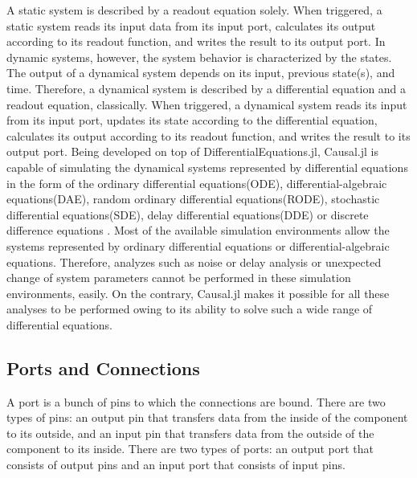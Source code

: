 \documentclass{juliacon}
\begin{document}
A static system is described by a readout equation solely. When triggered, a static system reads its input data from its input port, calculates its output according to its readout function, and writes the result to its output port. In dynamic systems, however, the system behavior is characterized by the states. The output of a dynamical system depends on its input, previous state(s), and time. Therefore, a dynamical system is described by a differential equation and a readout equation, classically. When triggered, a dynamical system reads its input from its input port, updates its state according to the differential equation, calculates its output according to its readout function, and writes the result to its output port. Being developed on top of DifferentialEquations.jl, Causal.jl is capable of simulating the dynamical systems represented by differential equations in the form of the ordinary differential equations(ODE), differential-algebraic equations(DAE), random ordinary differential equations(RODE), stochastic differential equations(SDE), delay differential equations(DDE) or discrete difference equations \cite{rackauckas2017differentialequations}. Most of the available simulation environments allow the systems represented by ordinary differential equations or differential-algebraic equations\cite{elmqvist1978structured,nytsch2006advanced,zimmer2008introducing,mosterman2002hybrsim,van2001variables,giorgidze2009higher,pfeiffer2012pysimulator,simulink}. Therefore, analyzes such as noise or delay analysis or unexpected change of system parameters cannot be performed in these simulation environments, easily. On the contrary, Causal.jl makes it possible for all these analyses to be performed owing to its ability to solve such a wide range of differential equations.

\subsection{Ports and Connections}
A port is a bunch of pins to which the connections are bound. There are two types of pins: an output pin that transfers data from the inside of the component to its outside, and an input pin that transfers data from the outside of the component to its inside. There are two types of ports: an output port that consists of output pins and an input port that consists of input pins.
\end{document}
